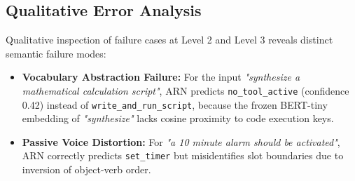\documentclass[conference]{IEEEtran}
\begin{document}
\begin{table}[t]
\caption{Per-Tool Zero-Shot OOD Breakdown for a representative subset of 6 key tools out of 16 registered APIs ($n$ indicates evaluation sample size per tool; $\dagger$ indicates low-support anecdotal probes. Total probes across all 16 tools sum to $N=50$ per level, $N=200$ total).}
\label{tab:per_tool}
\begin{center}
\small
{}
\end{center}
\end{table}

\subsection{Qualitative Error Analysis}
Qualitative inspection of failure cases at Level 2 and Level 3 reveals distinct semantic failure modes:
\begin{itemize}
    \item \textbf{Vocabulary Abstraction Failure:} For the input \emph{"synthesize a mathematical calculation script"}, ARN predicts \texttt{no\_tool\_active} (confidence 0.42) instead of \texttt{write\_and\_run\_script}, because the frozen BERT-tiny embedding of \emph{"synthesize"} lacks cosine proximity to code execution keys.
    \item \textbf{Passive Voice Distortion:} For \emph{"a 10 minute alarm should be activated"}, ARN correctly predicts \texttt{set\_timer} but misidentifies slot boundaries due to inversion of object-verb order.
\end{itemize}
\end{document}
